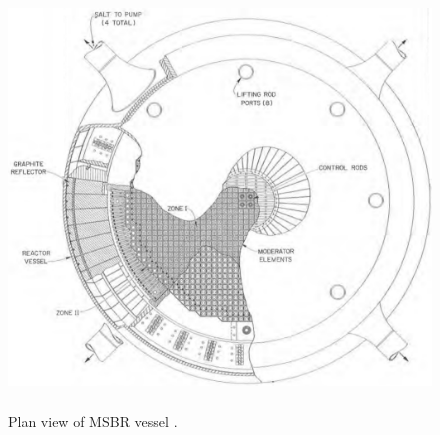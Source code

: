 \begin{frame}
\begin{textblock*}{12.5cm}
\begin{columns}
		\column[t]{5.6cm}
		\vspace{-1mm}
		\begin{figure}      
			\hspace{-12mm}
			\includegraphics[height=1.05\textwidth]{./images/plan_view_vessel.png}
			\caption{Plan view of \gls{MSBR} vessel 
				\cite{robertson_conceptual_1971}.}
		\end{figure}
	\end{columns}
	
\end{textblock*}

\end{frame}


